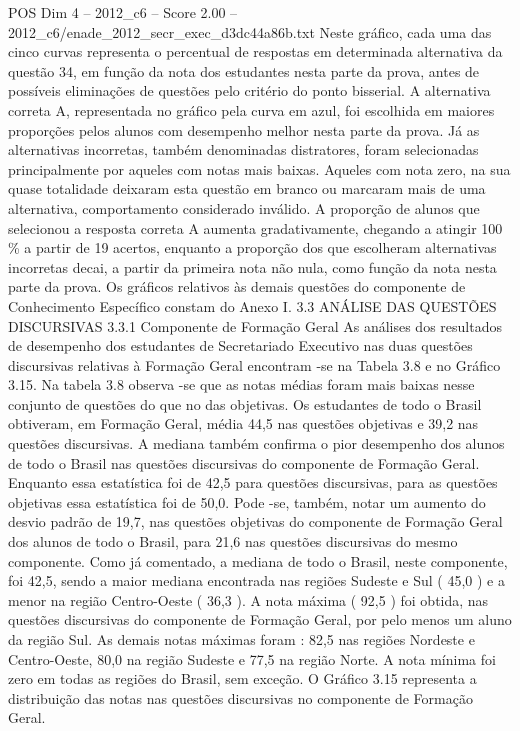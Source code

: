 \begin{textsample}{POS Dim 4 – 2012\_c6 – Score 2.00 – 2012\_c6/enade\_2012\_secr\_exec\_d3dc44a86b.txt}
Neste gráfico, cada uma das cinco curvas representa o percentual de respostas em determinada alternativa da questão 34, em função da nota dos estudantes nesta parte da prova, antes de possíveis eliminações de questões pelo critério do ponto bisserial.
A alternativa correta A, representada no gráfico pela curva em azul, foi escolhida em maiores proporções pelos alunos com desempenho melhor nesta parte da prova.
Já as alternativas incorretas, também denominadas distratores, foram selecionadas principalmente por aqueles com notas mais baixas.
Aqueles com nota zero, na sua quase totalidade deixaram esta questão em branco ou marcaram mais de uma alternativa, comportamento considerado inválido.
A proporção de alunos que selecionou a resposta correta A aumenta gradativamente, chegando a atingir 100 \% a partir de 19 acertos, enquanto a proporção dos que escolheram alternativas incorretas decai, a partir da primeira nota não nula, como função da nota nesta parte da prova.
Os gráficos relativos às demais questões do componente de Conhecimento Específico constam do Anexo I. 3.3 ANÁLISE DAS QUESTÕES DISCURSIVAS 3.3.1 Componente de Formação Geral As análises dos resultados de desempenho dos estudantes de Secretariado Executivo nas duas questões discursivas relativas à Formação Geral encontram -se na Tabela 3.8 e no Gráfico 3.15.
Na tabela 3.8 observa -se que as notas médias foram mais baixas nesse conjunto de questões do que no das objetivas.
Os estudantes de todo o Brasil obtiveram, em Formação Geral, média 44,5 nas questões objetivas e 39,2 nas questões discursivas.
A mediana também confirma o pior desempenho dos alunos de todo o Brasil nas questões discursivas do componente de Formação Geral.
Enquanto essa estatística foi de 42,5 para questões discursivas, para as questões objetivas essa estatística foi de 50,0.
Pode -se, também, notar um aumento do desvio padrão de 19,7, nas questões objetivas do componente de Formação Geral dos alunos de todo o Brasil, para 21,6 nas questões discursivas do mesmo componente.
Como já comentado, a mediana de todo o Brasil, neste componente, foi 42,5, sendo a maior mediana encontrada nas regiões Sudeste e Sul ( 45,0 ) e a menor na região Centro-Oeste ( 36,3 ).
A nota máxima ( 92,5 ) foi obtida, nas questões discursivas do componente de Formação Geral, por pelo menos um aluno da região Sul.
As demais notas máximas foram : 82,5 nas regiões Nordeste e Centro-Oeste, 80,0 na região Sudeste e 77,5 na região Norte.
A nota mínima foi zero em todas as regiões do Brasil, sem exceção.
O Gráfico 3.15 representa a distribuição das notas nas questões discursivas no componente de Formação Geral.

\end{textsample}
